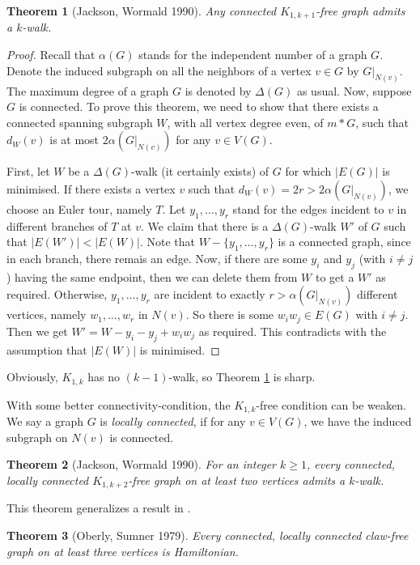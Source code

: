 \documentclass[12pt]{report}
\newtheorem{theorem}{Theorem}
\begin{document}
\begin{theorem}[Jackson, Wormald 1990]\label{k1kfkwalk}
Any connected $K_{1,k+1}$-free graph admits a $k$-walk.
\end{theorem}
\begin{proof}
Recall that $\alpha(G)$ stands for the independent number of a graph $G$. Denote the induced subgraph on all the neighbors of a vertex $v\in G$ by $G|_{N(v)}$. The maximum degree of a graph $G$ is denoted by $\Delta (G)$ as usual. Now, suppose $G$ is connected. To prove this theorem, we need to show that there exists a connected spanning subgraph $W$, with all vertex degree even, of $m*G$, such that $d_W(v)$ is at most $2\alpha(G|_{N(v)})$ for any $v\in V(G)$.

First, let $W$ be a $\Delta(G)$-walk (it certainly exists) of $G$ for which $|E(G)|$ is minimised.
If there exists a vertex $v$ such that $d_W(v)=2r>2\alpha(G|_{N(v)})$, we choose an Euler tour, namely $T$. Let $y_1,\ldots,y_r$ stand for the edges incident to $v$ in different branches of $T$ at $v$. We claim that there is a $\Delta(G)$-walk $W'$ of $G$ such that $|E(W')|<|E(W)|$. Note that $W-\{y_1,\ldots,y_r\}$ is a connected graph, since in each branch, there remais an edge. Now, if there are some $y_i$ and $y_j$ (with $i\neq j$) having the same endpoint, then we can delete them from $W$ to get a $W'$ as required. Otherwise, $y_1,\ldots,y_r$ are incident to exactly $r>\alpha(G|_{N(v)})$ different vertices, namely $w_1,\ldots,w_r$ in $N(v)$. So there is some $w_iw_j\in E(G)$ with $i\neq j$. Then we get $W'=W-y_i-y_j+w_iw_j$ as required. This contradicts with the assumption that $|E(W)|$ is minimised.



\end{proof}

Obviously, $K_{1,k}$ has no $(k-1)$-walk, so Theorem \ref{k1kfkwalk} is sharp.

With some better connectivity-condition, the $K_{1,k}$-free condition can be weaken. We say a graph $G$ is {\em locally connected}, if for any $v\in V(G)$, we have the induced subgraph on $N(v)$ is connected.

\begin{theorem}[Jackson, Wormald 1990]\label{k1k2fkw}
For an integer $k\ge1$, every connected, locally connected $K_{1,k+2}$-free graph on at least two vertices admits a $k$-walk.
\end{theorem}

This theorem generalizes a result in \cite{oberly1979every}.
\begin{theorem}[Oberly, Sumner 1979]\label{k13flnh}
Every connected, locally connected claw-free graph on at least three vertices is Hamiltonian.
\end{theorem}
\end{document}
